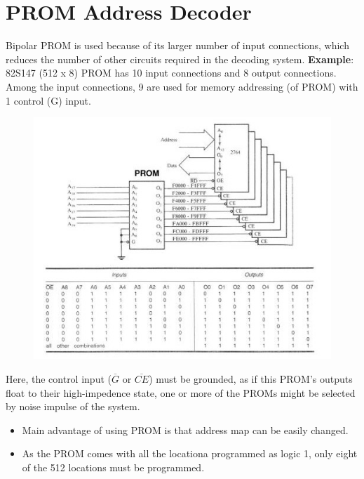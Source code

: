 \section{PROM Address Decoder}
Bipolar PROM is used because of its larger number of input connections, which reduces the number of other circuits required in the decoding system.\newline
\textbf{Example}: 82S147 (512 x 8) PROM has 10 input connections and 8 output connections. Among the input connections, 9 are used for memory addressing (of PROM) with 1 control (G) input. \newline
\begin{figure}[h!]
  \includegraphics[width = 1.0\textwidth]{./figures/PROM.jpg}
\end{figure}
Here, the control input ($\overline{G}$ or $\overline{CE}$) must be grounded, as if this PROM's outputs float to their high-impedence state, one or more of the PROMs might be selected by noise impulse of the system.
\begin{itemize}
  \item Main advantage of using PROM is that address map can be easily changed.
  \item As the PROM comes with all the locationa programmed as logic 1, only eight of the 512 locations must be programmed.
\end{itemize}

